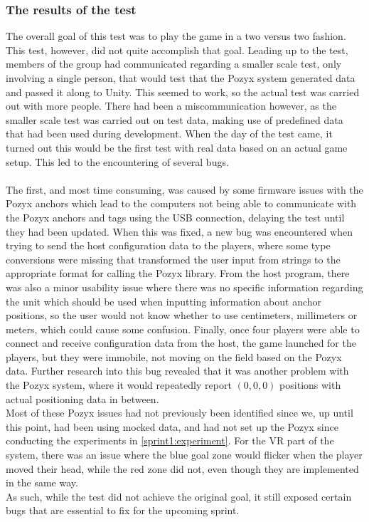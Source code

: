 \subsubsection{The results of the test}
The overall goal of this test was to play the game in a two versus two fashion.
This test, however, did not quite accomplish that goal.
Leading up to the test, members of the group had communicated regarding a smaller scale test, only involving a single person, that would test that the Pozyx system generated data and passed it along to Unity.
This seemed to work, so the actual test was carried out with more people.
There had been a miscommunication however, as the smaller scale test was carried out on test data, making use of predefined data that had been used during development.
When the day of the test came, it turned out this would be the first test with real data based on an actual game setup.
This led to the encountering of several bugs.
\\\\
The first, and most time consuming, was caused by some firmware issues with the Pozyx anchors which lead to the computers not being able to communicate with the Pozyx anchors and tags using the USB connection, delaying the test until they had been updated.
When this was fixed, a new bug was encountered when trying to send the host configuration data to the players, where some type conversions were missing that transformed the user input from strings to the appropriate format for calling the Pozyx library.
From the host program, there was also a minor usability issue where there was no specific information regarding the unit which should be used when inputting information about anchor positions, so the user would not know whether to use centimeters, millimeters or meters, which could cause some confusion.
Finally, once four players were able to connect and receive configuration data from the host, the game launched for the players, but they were immobile, not moving on the field based on the Pozyx data.
Further research into this bug revealed that it was another problem with the Pozyx system, where it would repeatedly report $(0,0,0)$ positions with actual positioning data in between.\\
Most of these Pozyx issues had not previously been identified since we, up until this point, had been using mocked data, and had not set up the Pozyx since conducting the experiments in \autoref{sprint1:experiment}.
For the VR part of the system, there was an issue where the blue goal zone would flicker when the player moved their head, while the red zone did not, even though they are implemented in the same way.\\
As such, while the test did not achieve the original goal, it still exposed certain bugs that are essential to fix for the upcoming sprint.
